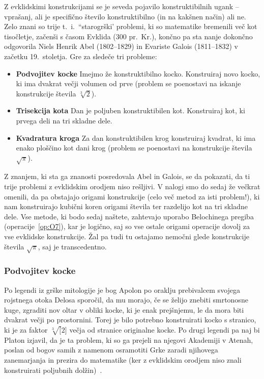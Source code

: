 Z evklidskimi konstrukcijami se je seveda pojavilo konstruktibilnih ugank -- vprašanj, ali je specifično število konstruktibilno (in na kakšnen način) ali ne. Zelo znani so trije t.\ i.\ ``starogrški' problemi, ki so matematike bremenili več kot tisočletje, začenši s časom Evklida (300 pr.\ Kr.), končno pa sta nanje dokončno odgovorila Niels Henrik Abel (1802--1829) in Evariste Galois (1811--1832) v začetku 19.\ stoletja. Gre za sledeče tri probleme:
\begin{itemize}
    \item \textbf{Podvojitev kocke} Imejmo že konstruktibilno kocko. Konstruiraj novo kocko, ki ima dvakrat večji volumen od prve (problem se poenostavi na iskanje konstrukcije števila $\sqrt[3]{2}$).
    \item \textbf{Trisekcija kota} Dan je poljuben konstruktibilen kot. Konstruiraj kot, ki prvega deli na tri skladne dele.
    \item \textbf{Kvadratura kroga} Za dan konstruktibilen krog konstruiraj kvadrat, ki ima enako ploščino kot dani krog (problem se poenostavi na konstrukcije števila $\sqrt{\pi}$).
\end{itemize}

Z znanjem, ki sta ga znanosti posredovala Abel in Galois, se da pokazati, da ti trije problemi z evklidskim orodjem niso rešljivi. V nalogi smo do sedaj že večkrat omenili, da pa obstajajo origami konstrukcije (celo več metod za isti problem!), ki nam konstruirajo kubični koren origami števila ter razdelijo kot na tri skladne dele. Vse metode, ki bodo sedaj naštete, zahtevajo uporabo Belochinega pregiba (operacije~\ref{op:O7}), kar je logično, saj so vse ostale origami operacije dovolj za vse evklidske konstrukcije. Žal pa tudi tu ostajamo nemočni glede konstrukcije števila $\sqrt{\pi}$, saj je transcedentno.

\subsubsection{Podvojitev kocke}
\label{podpogl:podvojitev_kocke}

Po legendi iz grške mitologije je bog Apolon po oraklju prebivalcem svojega rojstnega otoka Delosa sporočil, da mu morajo, če se želijo znebiti smrtonosne kuge, zgraditi nov oltar v obliki kocke, ki je enak prejšnjemu, le da mora biti dvakrat večji po prostornini. Torej je bilo potrebno konstruirati kocko s stranico, ki je za faktor $\sqrt[3][2]$ večja od stranice originalne kocke. Po drugi legendi pa naj bi Platon izjavil, da je ta problem, ki so ga prejeli na njegovi Akademiji v Atenah, poslan od bogov samih z namenom osramotiti Grke zaradi njihovega zanemarjanja in prezira do matematike (ker z evklidskim orodjem niso znali konstruirati poljubnih dolžin)~\cite[str.\ 29]{geometricconstructions}.

